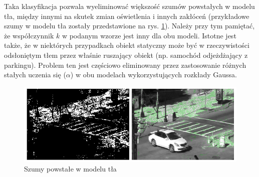 \documentclass[10pt,a4paper]{article}
\begin{document}
Taka klasyfikacja pozwala wyeliminować większość szumów powstałych w modelu tła, między innymi na skutek zmian oświetlenia i innych zakłóceń (przykładowe szumy w modelu tła zostały przedstawione na rys. \ref{fig:ftsg_illumination}). Należy przy tym pamiętać, że współczynnik $k$ w podanym wzorze jest inny dla obu modeli. Istotne jest także, że w niektórych przypadkach obiekt statyczny może być w rzeczywistości odsłoniętym tłem przez właśnie ruszający obiekt (np. samochód odjeżdżający z parkingu). Problem ten jest częściowo eliminowany przez zastosowanie różnych stałych uczenia się ($\alpha$) w obu modelach wykorzystujących rozkłady Gaussa.

	    \begin{figure}[h]
				\centering
				\includegraphics[scale=0.65]{img/ftsg_illumination.png}
				\caption{Szumy powstałe w modelu tła}
				\label{fig:ftsg_illumination}
		\end{figure}



\end{document}
